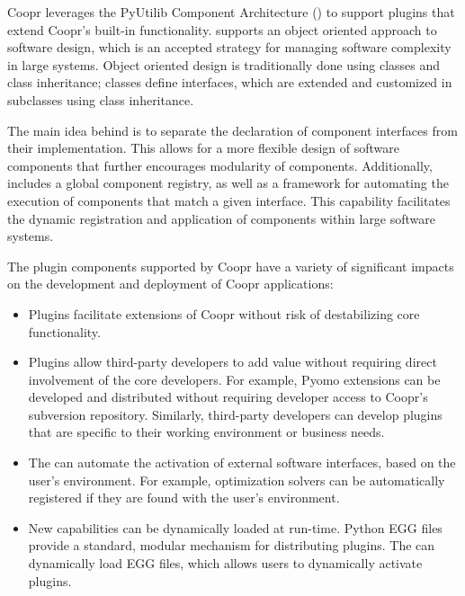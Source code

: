 


Coopr leverages the PyUtilib Component Architecture (\pca) to support
plugins that extend Coopr's built-in functionality.  \pcasp supports an
object oriented approach to software design, which is an accepted strategy
for managing software complexity in large systems.  Object oriented
design is traditionally done using classes and class inheritance;  classes
define interfaces, which are extended and customized in subclasses using
class inheritance.

The main idea behind \pcasp is to separate the declaration of component
interfaces from their implementation.  This allows for a more flexible
design of software components that further encourages modularity of
components.  Additionally, \pcasp includes a global component registry, as
well as a framework for automating the execution of components that match
a given interface.  This capability facilitates the dynamic registration
and application of components within large software systems.

The plugin components supported by Coopr have a variety of significant impacts
on the development and deployment of Coopr applications:
\begin{itemize}

\item Plugins facilitate extensions of Coopr without risk of destabilizing core functionality.  

\item Plugins allow third-party developers to add value without requiring direct involvement of the core developers.  For example, Pyomo extensions can be developed and distributed without requiring developer access to Coopr's subversion repository.  Similarly, third-party developers can develop 
plugins that are specific to their working environment or business needs.

\item The \pcasp can automate the activation of external software interfaces, based on the user's environment.  For example, optimization solvers can be
automatically registered if they are found with the user's  environment.

\item New capabilities can be dynamically loaded at run-time.  Python EGG files provide a standard, modular mechanism for distributing plugins.  The \pcasp can dynamically load EGG files, which allows users to dynamically activate 
plugins.

\end{itemize}

